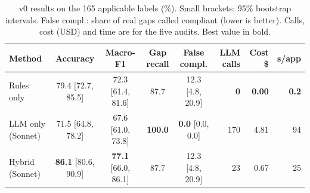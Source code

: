 
\begin{table}[htbp]
\caption{v0 results on the 165 applicable labels (\%). Small brackets: 95\% bootstrap intervals. False compl.: share of
real gaps called compliant (lower is better). Calls, cost (USD) and time are for the five audits. Best value in bold.}
\label{tab:main-results}
\centering\small
\setlength{\tabcolsep}{3pt}
\newcommand{\ci}[1]{{\scriptsize[#1]}}
\begin{tabular}{@{}lccccrrr@{}}
\toprule
\textbf{Method} & \textbf{Accuracy} & \textbf{Macro-F1} & \textbf{Gap recall} & \textbf{False compl.} &
\textbf{LLM calls} & \textbf{Cost \$} & \textbf{s/app} \\
\midrule
Rules only & 79.4 \ci{72.7, 85.5} & 72.3 \ci{61.4, 81.6} & 87.7 & 12.3 \ci{4.8, 20.9} & \textbf{0} & \textbf{0.00} & \textbf{0.2} \\
LLM only (Sonnet) & 71.5 \ci{64.8, 78.2} & 67.6 \ci{61.0, 73.8} & \textbf{100.0} & \textbf{0.0} \ci{0.0, 0.0} & 170 & 4.81 & 94 \\
Hybrid (Sonnet) & \textbf{86.1} \ci{80.6, 90.9} & \textbf{77.1} \ci{66.0, 86.1} & 87.7 & 12.3 \ci{4.8, 20.9} & 23 & 0.67 & 25 \\
\bottomrule
\end{tabular}
\end{table}
